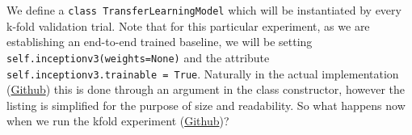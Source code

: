 




\noindent
We define a \texttt{class TransferLearningModel} which will be instantiated by every k-fold validation trial. Note that for this particular experiment, as we are establishing an end-to-end trained baseline, we will be setting \texttt{self.inceptionv3(weights=None)} and the attribute \texttt{self.inceptionv3.trainable = True}. Naturally in the actual implementation (\href{https://github.com/ShenZhouHong/radiography-ai-project/blob/cf8c9e9a1f07849787a98b2fc51df690354bf194/python/common/model.py}{Github}) this is done through an argument in the class constructor, however the listing is simplified for the purpose of size and readability. So what happens now when we run the kfold experiment (\href{https://github.com/ShenZhouHong/radiography-ai-project/blob/ef29e4cb63fc38185b3bb45fc37027df3e385a44/python/initial-evaluation/inceptionv3-end2end.ipynb}{Github})?

